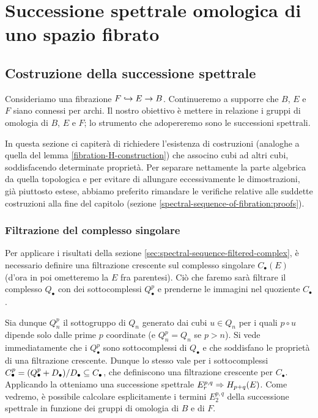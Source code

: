 \chapter{Successione spettrale omologica di uno spazio fibrato}
\label{ch:homological-spectral-sequence-of-fibration}
\section{Costruzione della successione spettrale}
Consideriamo una fibrazione \(F\hookrightarrow E\to B\). Continueremo a supporre che \(B\), \(E\) e \(F\) siano connessi per archi. Il nostro obiettivo è mettere in relazione i gruppi di omologia di \(B\), \(E\) e \(F\); lo strumento che adopereremo sono le successioni spettrali.

In questa sezione ci capiterà di richiedere l'esistenza di costruzioni (analoghe a quella del lemma \ref{fibration-H-construction}) che associno cubi ad altri cubi, soddisfacendo determinate proprietà. Per separare nettamente la parte algebrica da quella topologica e per evitare di allungare eccessivamente le dimostrazioni, già piuttosto estese, abbiamo preferito rimandare le verifiche relative alle suddette costruzioni alla fine del capitolo (sezione \ref{spectral-sequence-of-fibration:proofs}).

\subsection{Filtrazione del complesso singolare}
Per applicare i risultati della sezione \ref{sec:spectral-sequence-filtered-complex}, è necessario definire una filtrazione crescente sul complesso singolare \(C_\bullet(E)\) (d'ora in poi ometteremo la \(E\) fra parentesi). Ciò che faremo sarà filtrare il complesso \(Q_\bullet\) con dei sottocomplessi \(Q^p_\bullet\) e prenderne le immagini nel quoziente \(C_\bullet\).

Sia dunque \(Q^p_n\) il sottogruppo di \(Q_n\) generato dai cubi \(u\in Q_n\) per i quali \(p\circ u\) dipende solo dalle prime \(p\) coordinate (e \(Q^p_n=Q_n\) se \(p>n\)). Si vede immediatamente che i \(Q^p_\bullet\) sono sottocomplessi di \(Q_\bullet\) e che soddisfano le proprietà di una filtrazione crescente. Dunque lo stesso vale per i sottocomplessi \(C^p_\bullet=(Q^p_\bullet+D_\bullet)/D_\bullet\subseteq C_\bullet\), che definiscono una filtrazione crescente per \(C_\bullet\). Applicando la  otteniamo una successione spettrale \(E^{p,q}_r\Rightarrow H_{p+q}(E)\). Come vedremo, è possibile calcolare esplicitamente i termini \(E^{p,q}_2\) della successione spettrale in funzione dei gruppi di omologia di \(B\) e di \(F\).

